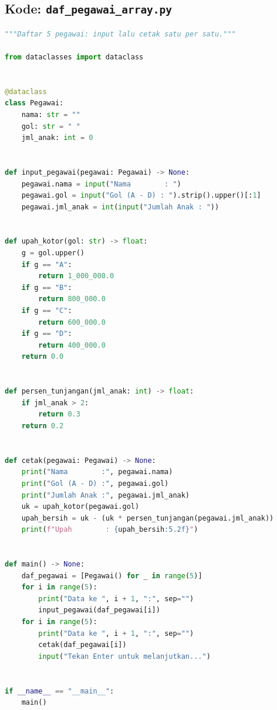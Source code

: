 \documentclass[../main.tex]{subfiles}
\begin{document}
\subsection{Kode: \texttt{daf\_pegawai\_array.py}}
\introstudikasuskode
\begin{lstlisting}[language=Python,caption={\texttt{daf\_pegawai\_array.py}}]
"""Daftar 5 pegawai: input lalu cetak satu per satu."""

from dataclasses import dataclass


@dataclass
class Pegawai:
    nama: str = ""
    gol: str = " "
    jml_anak: int = 0


def input_pegawai(pegawai: Pegawai) -> None:
    pegawai.nama = input("Nama        : ")
    pegawai.gol = input("Gol (A - D) : ").strip().upper()[:1]
    pegawai.jml_anak = int(input("Jumlah Anak : "))


def upah_kotor(gol: str) -> float:
    g = gol.upper()
    if g == "A":
        return 1_000_000.0
    if g == "B":
        return 800_000.0
    if g == "C":
        return 600_000.0
    if g == "D":
        return 400_000.0
    return 0.0


def persen_tunjangan(jml_anak: int) -> float:
    if jml_anak > 2:
        return 0.3
    return 0.2


def cetak(pegawai: Pegawai) -> None:
    print("Nama        :", pegawai.nama)
    print("Gol (A - D) :", pegawai.gol)
    print("Jumlah Anak :", pegawai.jml_anak)
    uk = upah_kotor(pegawai.gol)
    upah_bersih = uk - (uk * persen_tunjangan(pegawai.jml_anak))
    print(f"Upah        : {upah_bersih:5.2f}")


def main() -> None:
    daf_pegawai = [Pegawai() for _ in range(5)]
    for i in range(5):
        print("Data ke ", i + 1, ":", sep="")
        input_pegawai(daf_pegawai[i])
    for i in range(5):
        print("Data ke ", i + 1, ":", sep="")
        cetak(daf_pegawai[i])
        input("Tekan Enter untuk melanjutkan...")


if __name__ == "__main__":
    main()
\end{lstlisting}
\end{document}
